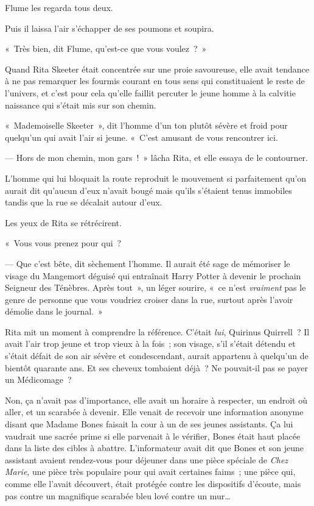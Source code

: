 Flume les regarda tous deux.

Puis il laissa l'air s'échapper de ses poumons et soupira.

«~Très bien, dit Flume, qu'est-ce que vous voulez~?~»


Quand Rita Skeeter était concentrée sur une proie savoureuse, elle avait tendance à ne pas remarquer les fourmis courant en tous sens qui constituaient le reste de l'univers, et c'est pour cela qu'elle faillit percuter le jeune homme à la calvitie naissance qui s'était mis sur son chemin.

«~Mademoiselle Skeeter~», dit l'homme d'un ton plutôt sévère et froid pour quelqu'un qui avait l'air si jeune. «~C'est amusant de vous rencontrer ici.

--- Hors de mon chemin, mon gars~!~» lâcha Rita, et elle essaya de le contourner.

L'homme qui lui bloquait la route reproduit le mouvement si parfaitement qu'on aurait dit qu'aucun d'eux n'avait bougé mais qu'ils s'étaient tenus immobiles tandis que la rue se décalait autour d'eux.

Les yeux de Rita se rétrécirent.

«~Vous vous prenez pour qui~?

--- Que c'est bête, dit sèchement l'homme. Il aurait été sage de mémoriser le visage du Mangemort déguisé qui entraînait Harry Potter à devenir le prochain Seigneur des Ténèbres. Après tout~», un léger sourire, «~ce n'est \emph{vraiment} pas le genre de personne que vous voudriez croiser dans la rue, surtout après l'avoir démolie dans le journal.~»

Rita mit un moment à comprendre la référence. C'était \emph{lui}, Quirinus Quirrell~? Il avait l'air trop jeune et trop vieux à la fois~; son visage, s'il s'était détendu et s'était défait de son air sévère et condescendant, aurait appartenu à quelqu'un de bientôt quarante ans. Et ses cheveux tombaient déjà~? Ne pouvait-il pas se payer un Médicomage~?

Non, ça n'avait pas d'importance, elle avait un horaire à respecter, un endroit où aller, et un scarabée à devenir. Elle venait de recevoir une information anonyme disant que Madame Bones faisait la cour à un de ses jeunes assistants. Ça lui vaudrait une sacrée prime si elle parvenait à le vérifier, Bones était haut placée dans la liste des cibles à abattre. L'informateur avait dit que Bones et son jeune assistant avaient rendez-vous pour déjeuner dans une pièce spéciale de \emph{Chez Marie}, une pièce très populaire pour qui avait certaines faims~; une pièce qui, comme elle l'avait découvert, était protégée contre les dispositifs d'écoute, mais pas contre un magnifique scarabée bleu lové contre un mur…

